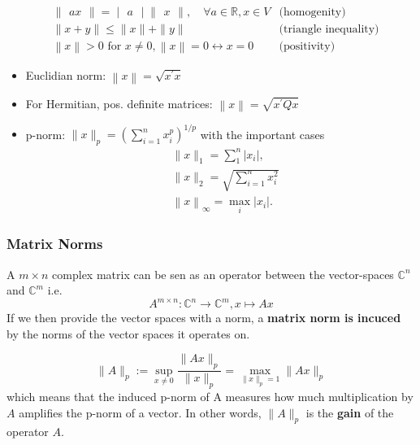 \begin{align*}
     & \begin{Vmatrix}ax\end{Vmatrix}  =\begin{vmatrix}a\end{vmatrix}\begin{Vmatrix}x\end{Vmatrix},\quad\forall a\in\mathbb{R},x\in V & \text{(homogenity)}          \\
     & \|x+y\|                         \leq\|x\|+\|y\|                                                                                & \text{(triangle inequality)} \\
     & \left\|x\right\|                >0 \text{ for } x\neq0, \left\|x\right\|=0\leftrightarrow x=0                                  & \text{(positivity)}
\end{align*}

\begin{itemize}
    \item Euclidian norm: $\left\|x\right\|=\sqrt{x^{\prime}x}$
    \item For Hermitian, pos. definite matrices: $\left\|x\right\|=\sqrt{x^{\prime}Qx}$
    \item p-norm: $\|x\|_p=\left(\sum_{i=1}^nx_i^p\right)^{1/p}$ with the important cases
          \begin{align*}
               & \|x\|_1=\sum_1^n\left|x_i\right|,               \\
               & \|x\|_2=\sqrt{\sum_{i=1}^nx_i^2}                \\
               & \left\|x\right\|_\infty=\max_i\left|x_i\right|.
          \end{align*}
\end{itemize}

\subsubsection{Matrix Norms}
A $m\times n$ complex matrix can be sen as an operator between the vector-spaces $\mathbb{C}^n$ and $\mathbb{C}^m$ i.e.
\begin{equation*}
    A^{m\times n}:\mathbb{C}^n\to\mathbb{C}^m,x\mapsto Ax
\end{equation*}
If we then provide the vector spaces with a norm, a \textbf{matrix norm is incuced} by the norms of the vector spaces it operates on.

\begin{equation*}
    \|A\|_p:=\sup_{x\neq0}\frac{\|Ax\|_p}{\|x\|_p}=\max_{\|x\|_p=1}\|Ax\|_p
\end{equation*}
which means that the induced p-norm of A measures how much multiplication by $A$ amplifies the p-norm of a vector. In other words, $\|A\|_p$ is the \textbf{gain} of the operator $A$.


